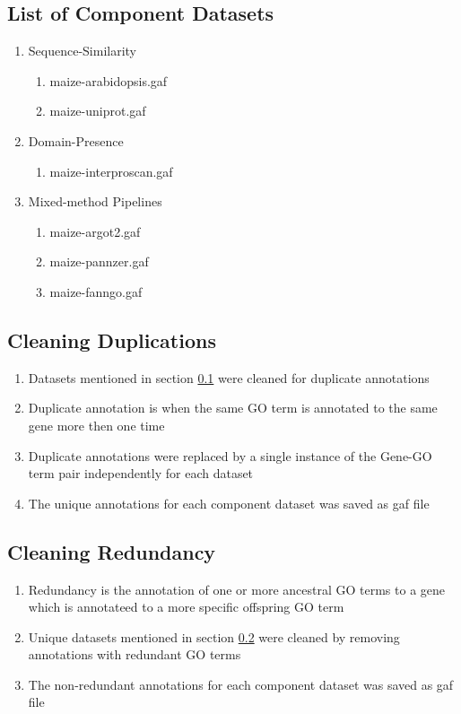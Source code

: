 \documentclass[11pt,letterpaper]{article}
\begin{document}
      \subsection{List of Component Datasets} \label{subsec:comp_data}
      \begin{enumerate}
        \item Sequence-Similarity
        \begin{enumerate}
          \item maize-arabidopsis.gaf
          \item maize-uniprot.gaf
        \end{enumerate}
        \item Domain-Presence
        \begin{enumerate}
          \item maize-interproscan.gaf
        \end{enumerate}
        \item Mixed-method Pipelines
        \begin{enumerate}
          \item maize-argot2.gaf
          \item maize-pannzer.gaf
          \item maize-fanngo.gaf
        \end{enumerate}
      \end{enumerate}
    \subsection{Cleaning Duplications} \label{subsec:remove_dup}
    \begin{enumerate}
      \item Datasets mentioned in section \ref{subsec:comp_data} were cleaned for duplicate annotations
      \item Duplicate annotation is when the same GO term is annotated to the same gene more then one time
      \item Duplicate annotations were replaced by a single instance of the Gene-GO term pair independently for each dataset
      \item The unique annotations for each component dataset was saved as gaf file
    \end{enumerate}
    \subsection{Cleaning Redundancy} \label{subsec:nonred_dat}
    \begin{enumerate}
      \item Redundancy is the annotation of one or more ancestral GO terms to a gene which is annotateed to a more specific offspring GO term
      \item Unique datasets mentioned in section \ref{subsec:remove_dup} were cleaned by removing annotations with redundant GO terms
      \item The non-redundant annotations for each component dataset was saved as gaf file
    \end{enumerate}
\end{document}
